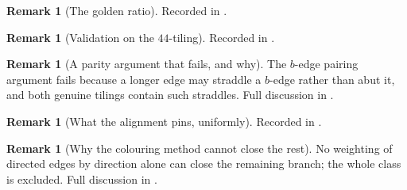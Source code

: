 \documentclass[11pt,reqno]{amsart}
\theoremstyle{plain}
\theoremstyle{definition}
\newtheorem{remark}[theorem]{Remark}
\begin{document}
\begin{remark}[The golden ratio]\label{rem:golden}
Recorded in \cite{Obstructions}.
\end{remark}



\begin{remark}[Validation on the $44$-tiling]\label{rem:rung2}
Recorded in \cite{Obstructions}.
\end{remark}





\begin{remark}[A parity argument that fails, and why]\label{rem:parityfail}
The $b$-edge pairing argument fails because a longer edge may straddle a $b$-edge rather than abut it, and both genuine tilings contain such straddles. Full discussion in \cite{Obstructions}.
\end{remark}

















\begin{remark}[What the alignment pins, uniformly]\label{rem:align}
Recorded in \cite{Obstructions}.
\end{remark}





\begin{remark}[Why the colouring method cannot close the rest]\label{rem:nogo}
No weighting of directed edges by direction alone can close the remaining branch; the whole class is excluded. Full discussion in \cite{Obstructions}.
\end{remark}
\end{document}
